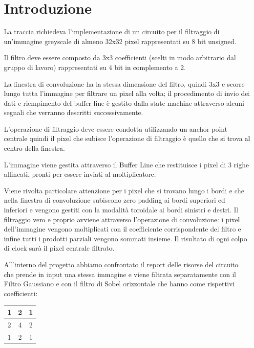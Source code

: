 \maketitle
\chapter{Introduzione}

La traccia richiedeva l'implementazione di un circuito per il filtraggio di un'immagine greyscale di almeno 32x32 pixel rappresentati su 8 bit unsigned. 

Il filtro deve essere composto da 3x3 coefficienti (scelti in modo arbitrario dal gruppo di lavoro) rappresentati su 4 bit in complemento a 2. 

La finestra di convoluzione ha la stessa dimensione del filtro, quindi 3x3 e scorre lungo tutta l'immagine per filtrare un pixel alla volta; il procedimento di invio dei dati e riempimento del buffer line è gestito dalla state machine attraverso alcuni segnali che verranno descritti successivamente. 

L'operazione di filtraggio deve essere condotta utilizzando un anchor point centrale quindi il pixel che subisce l'operazione di filtraggio è quello che si trova al centro della finestra.

\bigskip
L'immagine viene gestita attraverso il Buffer Line che restituisce i pixel di 3 righe allineati, pronti per essere inviati al moltiplicatore.

Viene rivolta particolare attenzione per i pixel che si trovano lungo i bordi e che nella finestra di convoluzione subiscono zero padding ai bordi superiori ed inferiori e vengono gestiti con la modalità toroidale ai bordi sinistri e destri.
Il filtraggio vero e proprio avviene attraverso l'operazione di convoluzione: i pixel dell'immagine vengono moltiplicati con il coefficiente corrispondente del filtro e infine tutti i prodotti parziali vengono sommati insieme. 
Il risultato di ogni colpo di clock sarà il pixel centrale filtrato.

All'interno del progetto abbiamo confrontato il report delle risorse del circuito che prende in input una stessa immagine e viene filtrata separatamente con il Filtro Gaussiano e con il filtro di Sobel orizzontale che hanno come rispettivi coefficienti:
\begin{table}[H]
\begin{tabular}{|c|c|c|}
\hline
1 & 2 & 1 \\ \hline
2 & 4 & 2 \\ \hline
1 & 2 & 1 \\ \hline
\end{tabular}
\end{table}

